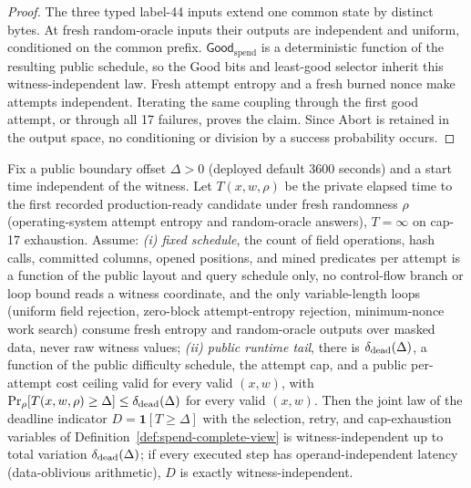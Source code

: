 \begin{proof}
The three typed label-44 inputs extend one common state by distinct bytes.
At fresh random-oracle inputs their outputs are independent and uniform,
conditioned on the common prefix.  \(\mathsf{Good}_{\mathrm{spend}}\) is a deterministic function of the
resulting public schedule, so the Good bits and least-good selector inherit
this witness-independent law.  Fresh attempt entropy and a fresh burned nonce
make attempts independent.  Iterating the same coupling through the first
good attempt, or through all 17 failures, proves the claim.  Since Abort is
retained in the output space, no conditioning or division by a success
probability occurs.
\end{proof}

\begin{lemma}
\label{lem:deadline-hiding-abort}
Fix a public boundary offset \(\Delta>0\) (deployed default \(3600\) seconds)
and a start time independent of the witness.  Let \(T(x,w,\rho)\) be the private
elapsed time to the first recorded production-ready candidate under fresh
randomness \(\rho\) (operating-system attempt entropy and random-oracle
answers), \(T=\infty\) on cap-17 exhaustion.  Assume: \emph{(i) fixed
schedule}, the count of field operations, hash calls, committed columns, opened
positions, and mined predicates per attempt is a function of the public layout
and query schedule only, no control-flow branch or loop bound reads a witness
coordinate, and the only variable-length loops (uniform field rejection,
zero-block attempt-entropy rejection, minimum-nonce work search) consume fresh
entropy and random-oracle outputs over masked data, never raw witness values;
\emph{(ii) public runtime tail}, there is \(\delta_{\rm dead}(\Delta)\), a
function of the public difficulty schedule, the attempt cap, and a public
per-attempt cost ceiling valid for every valid \((x,w)\), with
\(\Pr_\rho[T(x,w,\rho)\ge\Delta]\le\delta_{\rm dead}(\Delta)\) for every valid
\((x,w)\).  Then the joint law of the deadline indicator
\(D=\mathbf 1[T\ge\Delta]\) with the selection, retry, and cap-exhaustion
variables of Definition~\ref{def:spend-complete-view} is witness-independent up
to total variation \(\delta_{\rm dead}(\Delta)\); if every executed step has
operand-independent latency (data-oblivious arithmetic), \(D\) is exactly
witness-independent.
\end{lemma}

